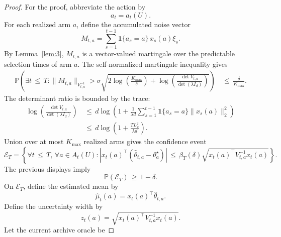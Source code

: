 \documentclass{article} %
\begin{document}
\begin{proof}
For the proof, abbreviate the action by
\begin{equation}
\label{eq:app-prop-action-short}
a_t
=
a_t(U).
\end{equation}
For each realized arm \(a\), define the accumulated noise vector
\begin{equation}
\label{eq:app-prop-noise-vector}
M_{t,a}
=
\sum_{s=1}^{t-1}
\mathbf{1}\{a_s=a\}\,x_s(a)\xi_s.
\end{equation}
By Lemma~\ref{lem:3}, \(M_{t,a}\) is a vector-valued martingale over the predictable selection times of arm \(a\).  The self-normalized martingale inequality gives
\begin{align}
\label{eq:app-self-normalized}
\mathbb{P}\!\left(
\exists t\,\le\, T:
\|M_{t,a}\|_{V_{t,a}^{-1}}
>
\sigma
\sqrt{
2\log\!\left(\frac{K_{\max}}{\delta}\right)
+
\log\!\left(\frac{\det V_{t,a}}{\det(\lambda I_d)}\right)
}
\right)
&\,\le\,
\frac{\delta}{K_{\max}}.
\end{align}
The determinant ratio is bounded by the trace:
\begin{align}
\label{eq:app-det-bound}
\log\!\left(\frac{\det V_{t,a}}{\det(\lambda I_d)}\right)
&\,\le\,
d\log\!\left(
1+
\frac{1}{\lambda d}
\sum_{s=1}^{t-1}
\mathbf{1}\{a_s=a\}\|x_s(a)\|_2^2
\right)
\\
&\,\le\,
d\log\!\left(
1+\frac{T L_x^2}{\lambda d}
\right).
\end{align}
Union over at most \(K_{\max}\) realized arms gives the confidence event
\begin{equation}
\label{eq:app-confidence-event}
\mathcal{E}_T
=
\left\{
\forall t\,\le\, T,\,
\forall a\in A_t(U):
\left|
x_t(a)^\top(\widehat{\theta}_{t,a}-\theta_a^\star)
\right|
\,\le\,
\beta_T(\delta)
\sqrt{x_t(a)^\top V_{t,a}^{-1}x_t(a)}
\right\}.
\end{equation}
The previous displays imply
\begin{equation}
\label{eq:app-confidence-prob}
\mathbb{P}(\mathcal{E}_T)
\,\ge\,
1-\delta.
\end{equation}
On \(\mathcal{E}_T\), define the estimated mean by
\begin{equation}
\label{eq:app-estimated-mean}
\widehat{\mu}_t(a)
=
x_t(a)^\top\widehat{\theta}_{t,a}.
\end{equation}
Define the uncertainty width by
\begin{equation}
\label{eq:app-width}
z_t(a)
=
\sqrt{x_t(a)^\top V_{t,a}^{-1}x_t(a)}.
\end{equation}
Let the current archive oracle be

\end{proof}
\end{document}
